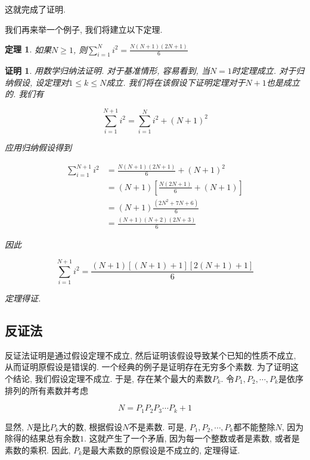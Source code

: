 \documentclass[oneside,10pt,fontset=none]{ctexbook}
\numberwithin{definition}{chapter}
\newtheorem{theorem}{定理}
\numberwithin{theorem}{chapter}
\numberwithin{lemma}{chapter}
\newtheorem*{myproof}{证明}
\begin{document}
这就完成了证明.

我们再来举一个例子, 我们将建立以下定理.

\begin{theorem}
    如果$N\geq 1$, 则$\sum_{i=1}^{N}i^2=\frac{N(N+1)(2N+1)}{6}$
\end{theorem}

\begin{myproof}
    用数学归纳法证明. 对于基准情形, 容易看到, 当$N=1$时定理成立. 对于归纳假设, 设定理对$1\leq k\leq N$成立. 我们将在该假设下证明定理对于$N+1$也是成立的. 我们有

    \begin{equation*}
        \sum_{i=1}^{N+1}i^2=\sum_{i=1}^{N}i^2+(N+1)^2
    \end{equation*}

    应用归纳假设得到

    \begin{equation*}
        \begin{split}
            \sum_{i=1}^{N+1}i^2 &= \frac{N(N+1)(2N+1)}{6} + (N+1)^2 \\
                                &= (N+1)[\frac{N(2N+1)}{6} + (N+1)] \\
                                &= (N+1)\frac{(2N^2+7N+6)}{6} \\
                                &= \frac{(N+1)(N+2)(2N+3)}{6}
        \end{split}
    \end{equation*}

    因此

    \begin{equation*}
        \sum_{i=1}^{N+1}i^2 = \frac{(N+1)[(N+1)+1][2(N+1)+1]}{6}
    \end{equation*}

    定理得证.
\end{myproof}

\subsection{反证法}

反证法证明是通过假设定理不成立, 然后证明该假设导致某个已知的性质不成立, 从而证明原假设是错误的. 一个经典的例子是证明存在无穷多个素数. 为了证明这个结论, 我们假设定理不成立. 于是, 存在某个最大的素数$P_k$. 令$P_1,P_2,\cdots,P_k$是依序排列的所有素数并考虑

$$
N=P_1P_2P_3\cdots P_k+1
$$

显然, $N$是比$P_k$大的数, 根据假设$N$不是素数. 可是, $P_1,P_2,\cdots,P_k$都不能整除$N$, 因为除得的结果总有余数$1$. 这就产生了一个矛盾, 因为每一个整数或者是素数, 或者是素数的乘积. 因此, $P_k$是最大素数的原假设是不成立的, 定理得证.
\end{document}
